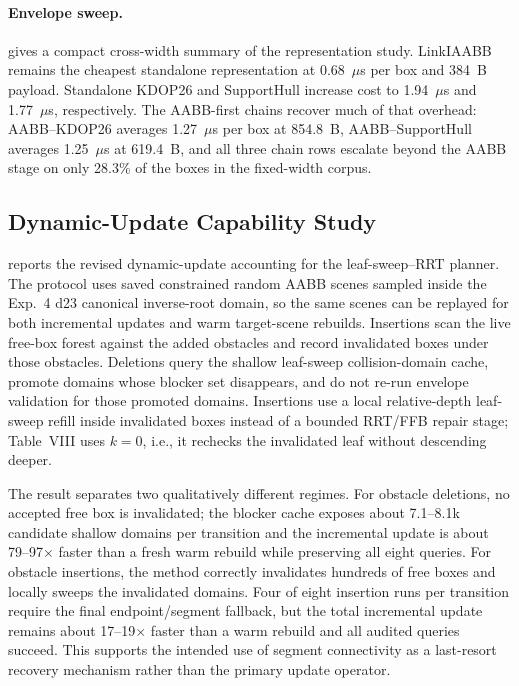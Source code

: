 

\paragraph{Envelope sweep.}
 gives a compact cross-width summary of
the representation study. LinkIAABB remains the cheapest standalone
representation at 0.68~$\mu$s per box and 384~B payload. Standalone KDOP26 and
SupportHull increase cost to 1.94~$\mu$s and 1.77~$\mu$s, respectively. The
AABB-first chains recover much of that overhead: AABB--KDOP26 averages
1.27~$\mu$s per box at 854.8~B, AABB--SupportHull averages 1.25~$\mu$s at
619.4~B, and all three chain rows escalate beyond the AABB stage on only 28.3\%
of the boxes in the fixed-width corpus.


\subsection{Dynamic-Update Capability Study}\label{sec:exp_dynamic_updates}

 reports the revised dynamic-update accounting
for the leaf-sweep--RRT planner. The protocol uses saved constrained random
AABB scenes sampled inside the Exp.~4 d23 canonical inverse-root domain, so the
same scenes can be replayed for both incremental updates and warm target-scene
rebuilds. Insertions scan the live free-box forest against the added obstacles
and record invalidated boxes under those obstacles. Deletions query the shallow
leaf-sweep collision-domain cache, promote domains whose blocker set
disappears, and do not re-run envelope validation for those promoted domains.
Insertions use a local relative-depth leaf-sweep refill inside invalidated boxes
instead of a bounded RRT/FFB repair stage; Table~VIII uses $k=0$, i.e., it
rechecks the invalidated leaf without descending deeper.



The result separates two qualitatively different regimes. For obstacle
deletions, no accepted free box is invalidated; the blocker cache exposes about
7.1--8.1k candidate shallow domains per transition and the incremental update is
about 79--97$\times$ faster than a fresh warm rebuild while preserving all
eight queries. For obstacle insertions, the method correctly invalidates
hundreds of free boxes and locally sweeps the invalidated domains. Four of
eight insertion runs per transition require the final endpoint/segment fallback,
but the total incremental update remains about 17--19$\times$ faster than a warm
rebuild and all audited queries succeed. This supports the intended use of
segment connectivity as a last-resort recovery mechanism rather than the
primary update operator.

